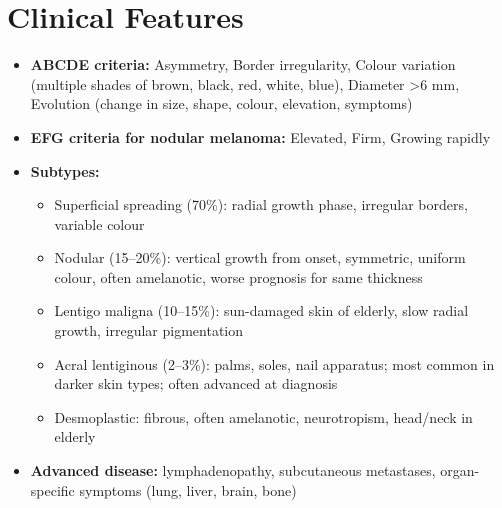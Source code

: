 \section*{Clinical Features}
\begin{itemize}
    \item \textbf{ABCDE criteria:} Asymmetry, Border irregularity, Colour variation (multiple shades of brown, black, red, white, blue), Diameter >6 mm, Evolution (change in size, shape, colour, elevation, symptoms)
    \item \textbf{EFG criteria for nodular melanoma:} Elevated, Firm, Growing rapidly
    \item \textbf{Subtypes:}
    \begin{itemize}
        \item Superficial spreading (70\%): radial growth phase, irregular borders, variable colour
        \item Nodular (15--20\%): vertical growth from onset, symmetric, uniform colour, often amelanotic, worse prognosis for same thickness
        \item Lentigo maligna (10--15\%): sun-damaged skin of elderly, slow radial growth, irregular pigmentation
        \item Acral lentiginous (2--3\%): palms, soles, nail apparatus; most common in darker skin types; often advanced at diagnosis
        \item Desmoplastic: fibrous, often amelanotic, neurotropism, head/neck in elderly
    \end{itemize}
    \item \textbf{Advanced disease:} lymphadenopathy, subcutaneous metastases, organ-specific symptoms (lung, liver, brain, bone)
\end{itemize}

